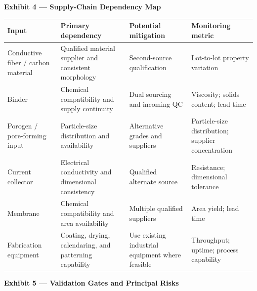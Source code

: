\documentclass[11pt,letterpaper]{article}
\newcommand{\exhibitheading}[1]{%
    \needspace{8\baselineskip}%
    \begin{tcolorbox}[
        colback=HIFENavy,
        colframe=HIFENavy,
        boxrule=0pt,
        arc=1.5mm,
        left=4mm,
        right=4mm,
        top=1.5mm,
        bottom=1.5mm
    ]
    \color{white}\bfseries #1
    \end{tcolorbox}%
}
\begin{document}

\exhibitheading{Exhibit 4 --- Supply-Chain Dependency Map}

\begin{samepage}
\small
\begin{center}
\begin{tabularx}{\textwidth}{
    L{0.24\textwidth}
    L{0.28\textwidth}
    L{0.23\textwidth}
    L{0.17\textwidth}
}
\toprule
\textbf{Input}
&
\textbf{Primary dependency}
&
\textbf{Potential mitigation}
&
\textbf{Monitoring metric}
\\
\midrule

Conductive fiber / carbon material
&
Qualified material supplier and consistent morphology
&
Second-source qualification
&
Lot-to-lot property variation
\\

Binder
&
Chemical compatibility and supply continuity
&
Dual sourcing and incoming QC
&
Viscosity; solids content; lead time
\\

Porogen / pore-forming input
&
Particle-size distribution and availability
&
Alternative grades and suppliers
&
Particle-size distribution; supplier concentration
\\

Current collector
&
Electrical conductivity and dimensional consistency
&
Qualified alternate source
&
Resistance; dimensional tolerance
\\

Membrane
&
Chemical compatibility and area availability
&
Multiple qualified suppliers
&
Area yield; lead time
\\

Fabrication equipment
&
Coating, drying, calendaring, and patterning capability
&
Use existing industrial equipment where feasible
&
Throughput; uptime; process capability
\\

\bottomrule
\end{tabularx}
\end{center}
\normalsize
\end{samepage}



\exhibitheading{Exhibit 5 --- Validation Gates and Principal Risks}
\end{document}
